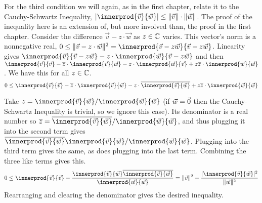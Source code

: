 For the third condition we will again, as in the first
chapter, relate it to the Cauchy-Schwartz Inequality,
$\absval{\innerprod{\vec{v}}{\vec{w}}}\leq \norm{\vec{v}}\cdot\norm{\vec{w}}$.
The proof of the inequality here is an extension of, 
but more involved than, the proof in the first chapter. 
Consider the difference $\vec{v}-z\cdot\vec{w}$ as $z\in\mathbb{C}$ varies.
This vector's norm is a nonnegative real,
$0\leq \norm{\vec{v}-z\cdot\vec{w}}^2
   =\innerprod{\vec{v}-z\vec{w}}{\vec{v}-z\vec{w}}$.
Linearity gives
$\innerprod{\vec{v}}{\vec{v}-z\vec{w}}
  -z\cdot\innerprod{\vec{w}}{\vec{v}-z\vec{w}}$
and then
$\innerprod{\vec{v}}{\vec{v}}
  -\compconj{z}\cdot\innerprod{\vec{v}}{\vec{w}}
  -z\cdot\innerprod{\vec{w}}{\vec{v}}
  +z\compconj{z}\cdot\innerprod{\vec{w}}{\vec{w}}$.
We have this for all $z\in\mathbb{C}$.
\begin{equation*}
 0
  \leq\innerprod{\vec{v}}{\vec{v}}
  -\compconj{z}\cdot\innerprod{\vec{v}}{\vec{w}}
  -z\cdot\compconj{\innerprod{\vec{v}}{\vec{w}}}
  +z\compconj{z}\cdot\innerprod{\vec{w}}{\vec{w}}
\end{equation*}

Take 
$z=\innerprod{\vec{v}}{\vec{w}}/\innerprod{\vec{w}}{\vec{w}}$
(if $\vec{w}=\vec{0}$ then the Cauchy-Schwartz Inequality is trivial, so we
ignore this case).
Its denominator is a real number so
$\compconj{z}=\compconj{\innerprod{\vec{v}}{\vec{w}}}/\innerprod{\vec{w}}{\vec{w}}$,
and thus plugging it into the second term gives 
$\compconj{\innerprod{\vec{v}}{\vec{w}}}\innerprod{\vec{v}}{\vec{w}}/\innerprod{\vec{w}}{\vec{w}}$.
Plugging into the third term gives the same,
as does plugging into the last term.
Combining the three like terms gives this.
\begin{equation*}
 0
  \leq\innerprod{\vec{v}}{\vec{v}}
  -\frac{\innerprod{\vec{v}}{\vec{w}}\compconj{\innerprod{\vec{v}}{\vec{w}}}}{\innerprod{\vec{w}}{\vec{w}}}
  =\norm{\vec{v}}^2
  -\frac{\absval{\innerprod{\vec{v}}{\vec{w}}}^2}{\norm{\vec{w}}^2}
\end{equation*}
Rearranging and clearing the denominator gives the desired 
inequality.

